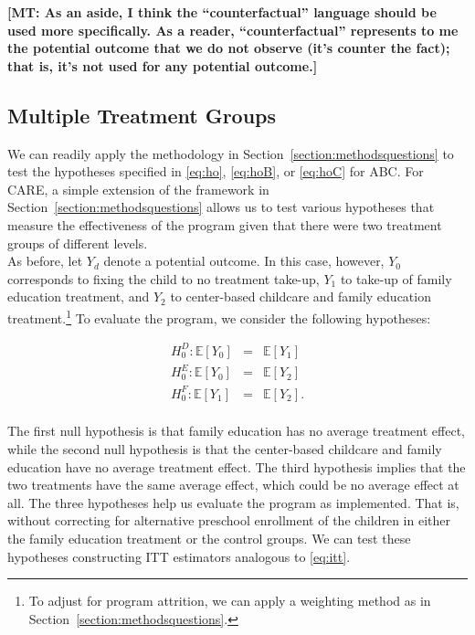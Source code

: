 \textbf{[MT: As an aside, I think the ``counterfactual'' language should be used more specifically. As a reader, ``counterfactual'' represents to me the potential outcome that we do not observe (it's counter the fact); that is, it's not used for any potential outcome.]} \\

\subsection{Multiple Treatment Groups}

\noindent We can readily apply the methodology in Section~\ref{section:methodsquestions} to test the hypotheses specified in \eqref{eq:ho}, \eqref{eq:hoB}, or \eqref{eq:hoC} for ABC. For CARE, a simple extension of the framework in Section~\ref{section:methodsquestions} allows us to test various hypotheses that measure the effectiveness of the program given that there were two treatment groups of different levels.\\

\noindent As before, let $Y_{d}$ denote a potential outcome. In this case, however, $Y_{0}$ corresponds to fixing the child to no treatment take-up,  $Y_{1}$ to take-up of family education treatment, and $Y_{2}$ to center-based childcare and family education treatment.\footnote{To adjust for program attrition, we can apply a weighting method as in Section~\ref{section:methodsquestions}.} To evaluate the program, we consider the following hypotheses: 

\begin{eqnarray}
H_{0}^D: \mathbb{E} \left[ Y_{0} \right] &=&  \mathbb{E} \left[ Y_{1} \right] \\ 
H_{0}^E: \mathbb{E} \left[ Y_{0} \right] &=&  \mathbb{E} \left[ Y_{2} \right] \\
H_{0}^F: \mathbb{E} \left[ Y_{1} \right] &=&  \mathbb{E} \left[ Y_{2} \right]. 
\end{eqnarray}\\

\noindent The first null hypothesis is that family education has no average treatment effect, while the second null hypothesis is that the center-based childcare and family education have no average treatment effect. The third hypothesis implies that the two treatments have the same average effect, which could be no average effect at all. The three hypotheses help us evaluate the program as implemented. That is, without correcting for alternative preschool enrollment of the children in either the family education treatment or the control groups. We can test these hypotheses constructing ITT estimators analogous to \eqref{eq:itt}.\\ 

